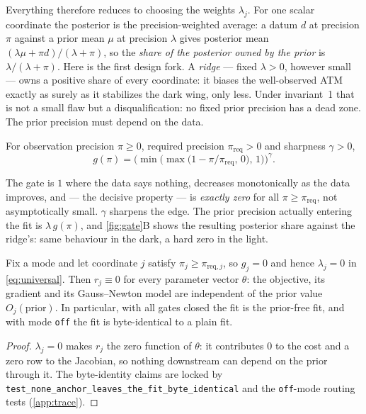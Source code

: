 \documentclass[11pt]{article}
\begin{document}
Everything therefore reduces to choosing the weights $\lambda_j$.  For
one scalar coordinate the posterior is the precision-weighted average:
a datum $d$ at precision $\pi$ against a prior mean $\mu$ at precision
$\lambda$ gives posterior mean $(\lambda\mu+\pi d)/(\lambda+\pi)$, so
the \emph{share of the posterior owned by the prior} is
$\lambda/(\lambda+\pi)$.  Here is the first design fork.  A
\emph{ridge} --- fixed $\lambda>0$, however small --- owns a positive
share of every coordinate: it biases the well-observed ATM exactly as
surely as it stabilizes the dark wing, only less.  Under invariant~1
that is not a small flaw but a disqualification: no fixed prior
precision has a dead zone.  The prior precision must depend on the
data.

\begin{definition}
\label{def:gate}
For observation precision $\pi\ge0$, required precision
$\pi_{\mathrm{req}}>0$ and sharpness $\gamma>0$,
\begin{equation}
g(\pi)=\Big(\min\big(\max\big(1-\pi/\pi_{\mathrm{req}},\,0\big),
\,1\big)\Big)^{\gamma}.
\label{eq:gate}
\end{equation}
\end{definition}

The gate is $1$ where the data says nothing, decreases monotonically
as the data improves, and --- the decisive property --- is
\emph{exactly zero} for all $\pi\ge\pi_{\mathrm{req}}$, not
asymptotically small.  $\gamma$ sharpens the edge.  The prior
precision actually entering the fit is $\lambda\,g(\pi)$, and
\cref{fig:gate}B shows the resulting posterior share against the
ridge's: same behaviour in the dark, a hard zero in the light.

\begin{proposition}
\label{prop:nodamp}
Fix a mode and let coordinate $j$ satisfy
$\pi_j\ge\pi_{\mathrm{req},j}$, so $g_j=0$ and hence $\lambda_j=0$ in
\eqref{eq:universal}.  Then $r_j\equiv0$ for every parameter vector
$\theta$: the objective, its gradient and its Gauss--Newton model are
independent of the prior value $O_j(\text{prior})$.  In particular,
with all gates closed the fit is the prior-free fit, and with mode
\texttt{off} the fit is byte-identical to a plain fit.
\end{proposition}

\begin{proof}
$\lambda_j=0$ makes $r_j$ the zero function of $\theta$: it
contributes $0$ to the cost and a zero row to the Jacobian, so nothing
downstream can depend on the prior through it.  The byte-identity
claims are locked by
\texttt{test\_none\_anchor\_leaves\_the\_fit\_byte\_identical} and the
\texttt{off}-mode routing tests (\cref{app:trace}).
\end{proof}
\end{document}
